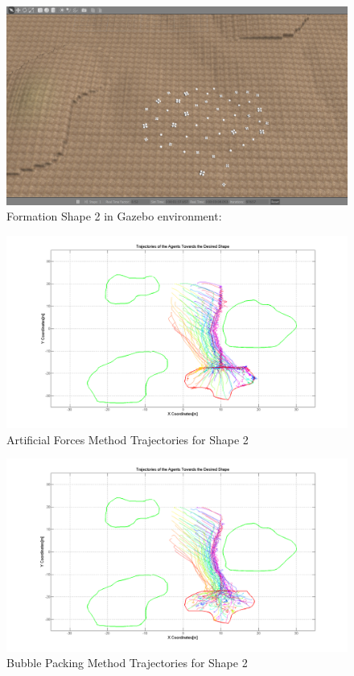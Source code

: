 \documentclass[twoside]{article}
\begin{document}
		   \begin{figure}[H]
		   	\caption{Formation Shape 2 in Gazebo environment:}
		   	\centerline{\includegraphics[scale = 0.35]{Trajectories_Formation_Shape_2_1}}
		   \end{figure} 	
		   
		   \begin{figure}[H]
		   	\caption{Artificial Forces Method Trajectories for Shape 2}
		   	\centerline{\includegraphics[scale = 0.35]{Artificial_Trajectories_2}}
		   \end{figure} 	
		   
		   \begin{figure}[H]
		   	\caption{Bubble Packing Method Trajectories for Shape 2}
		   	\centerline{\includegraphics[scale = 0.35]{Bubble_Trajectories_2}}
		   \end{figure} 	
		   
\end{document}
